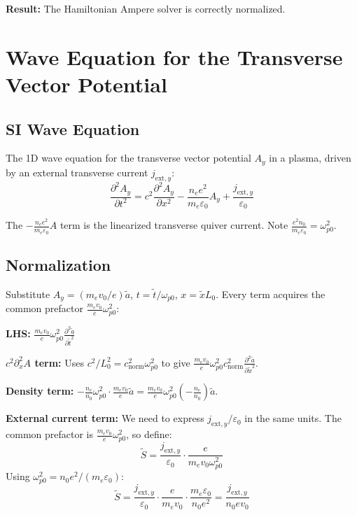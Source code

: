 \documentclass[11pt]{article}
\newcommand{\tl}[1]{\tilde{#1}}
\newcommand{\cnorm}{c_{\text{norm}}}
\newcommand{\wpz}{\omega_{p0}}
\begin{document}
\begin{center}
\colorbox{green!15}{\parbox{0.85\textwidth}{
\textbf{Result:} The Hamiltonian Ampere solver is correctly normalized.
}}
\end{center}

\newpage
\section{Wave Equation for the Transverse Vector Potential}
\label{sec:wave}

\subsection{SI Wave Equation}

The 1D wave equation for the transverse vector potential $A_y$ in a plasma, driven by an external transverse current $j_{\text{ext},y}$:
\begin{equation}
    \frac{\partial^2 A_y}{\partial t^2} = c^2 \frac{\partial^2 A_y}{\partial x^2}
    - \frac{n_e e^2}{m_e \varepsilon_0} A_y + \frac{j_{\text{ext},y}}{\varepsilon_0}
    \label{eq:wave-SI}
\end{equation}

The $-\frac{n_e e^2}{m_e \varepsilon_0} A$ term is the linearized transverse quiver current. Note $\frac{e^2 n_0}{m_e \varepsilon_0} = \wpz^2$.

\subsection{Normalization}

Substitute $A_y = (m_e v_0 / e) \tl{a}$, $t = \tl{t}/\wpz$, $x = \tl{x} L_0$. Every term acquires the common prefactor $\frac{m_e v_0}{e} \wpz^2$:

\textbf{LHS:} $\frac{m_e v_0}{e} \wpz^2 \frac{\partial^2 \tl{a}}{\partial \tl{t}^2}$

\textbf{$c^2 \partial^2_x A$ term:} Uses $c^2/L_0^2 = \cnorm^2 \wpz^2$ to give $\frac{m_e v_0}{e} \wpz^2 \cnorm^2 \frac{\partial^2 \tl{a}}{\partial \tl{x}^2}$.

\textbf{Density term:} $-\frac{n_e}{n_0} \wpz^2 \cdot \frac{m_e v_0}{e} \tl{a} = \frac{m_e v_0}{e} \wpz^2 \left(-\frac{n_e}{n_0}\right) \tl{a}$.

\textbf{External current term:} We need to express $j_{\text{ext},y}/\varepsilon_0$ in the same units. The common prefactor is $\frac{m_e v_0}{e} \wpz^2$, so define:
\begin{equation}
    \tl{S} = \frac{j_{\text{ext},y}}{\varepsilon_0} \cdot \frac{e}{m_e v_0 \wpz^2}
\end{equation}
Using $\wpz^2 = n_0 e^2/(m_e \varepsilon_0)$:
\begin{equation}
    \tl{S} = \frac{j_{\text{ext},y}}{\varepsilon_0} \cdot \frac{e}{m_e v_0} \cdot \frac{m_e \varepsilon_0}{n_0 e^2}
    = \frac{j_{\text{ext},y}}{n_0 e v_0}
    \label{eq:S-derivation}
\end{equation}
\end{document}
